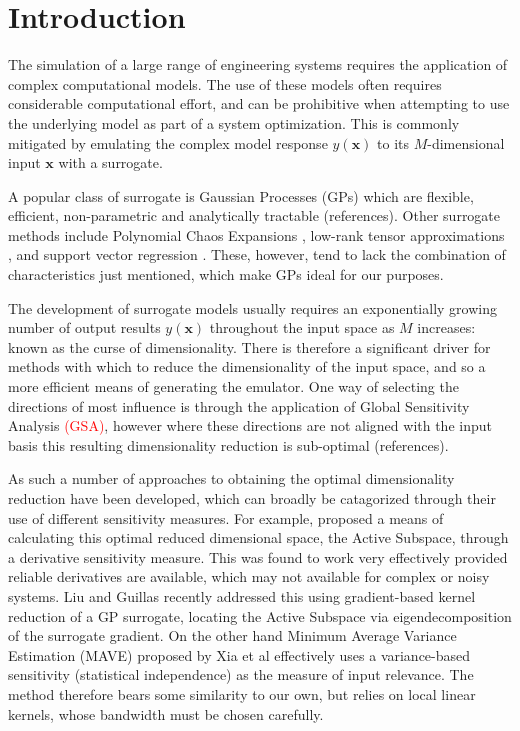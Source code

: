 \documentclass[preprint,12pt]{elsarticle}
\newcommand*{\M}[1]{\ensuremath{#1}\xspace}
\newcommand*{\vr}[1]{\M{\mathbf{#1}}}
\begin{document}

    \section{Introduction} \label{sec:Intro}
        The simulation of a large range of engineering systems requires the application of complex computational models. The use of these models often requires considerable computational effort, and can be prohibitive when attempting to use the underlying model as part of a system optimization. This is commonly mitigated by emulating the complex model response $y(\vr{x})$ to its \M{M}-dimensional input $\vr{x}$ with a surrogate. 
        
        A popular class of surrogate is Gaussian Processes (GPs) \cite{Sacks.etal1989, Rasmussen.Williams2005} which are flexible, efficient, non-parametric and analytically tractable (references). Other surrogate methods include Polynomial Chaos Expansions \cite{Ghanem.Spanos1997,Xiu.Karniadakis2002,Xiu2010}, low-rank tensor approximations \cite{Chevreuil.etal2015,Konakli.Sudret2016}, and support vector regression \cite{Cortes.Vapnik1995}.
        These, however, tend to lack the combination of characteristics just mentioned, which make GPs ideal for our purposes.
        
        The development of surrogate models usually requires an exponentially growing number of output results $y(\vr{x})$ throughout the input space as \M{M} increases: known as the curse of dimensionality. There is therefore a significant driver for methods with which to reduce the dimensionality of the input space, and so a more efficient means of generating the emulator. One way of selecting the directions of most influence is through the application of Global Sensitivity Analysis \textcolor{red}{(GSA)}, however where these directions are not aligned with the input basis this resulting dimensionality reduction is sub-optimal (references).
        
        As such a number of approaches to obtaining the optimal dimensionality reduction have been developed, which can broadly be catagorized through their use of different sensitivity measures. For example, \cite{Constantine.etal2014} proposed a means of calculating this optimal reduced dimensional space, the Active Subspace, through a derivative sensitivity measure. This was found to work very effectively provided reliable derivatives are available, which may not available for complex or noisy systems. Liu and Guillas \cite{Liu.Guillas2017} recently addressed this using gradient-based kernel reduction of a GP surrogate, locating the Active Subspace via eigendecomposition of the surrogate gradient.
        On the other hand Minimum Average Variance Estimation (MAVE) proposed by Xia et al \cite{Xia.etal2002} effectively uses a variance-based sensitivity (statistical independence) as the measure of input relevance. The method therefore bears some similarity to our own, but relies on local linear kernels, whose bandwidth must be chosen carefully.
         
\end{document}
